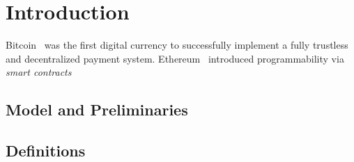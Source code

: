 \section{Introduction}

Bitcoin~\cite{bitcoin} was the first digital currency to successfully implement a fully trustless and decentralized payment system.  Ethereum~\cite{ethereum} introduced programmability via \emph{smart contracts} 

\subsection{Model and Preliminaries}
\subsection{Definitions}
